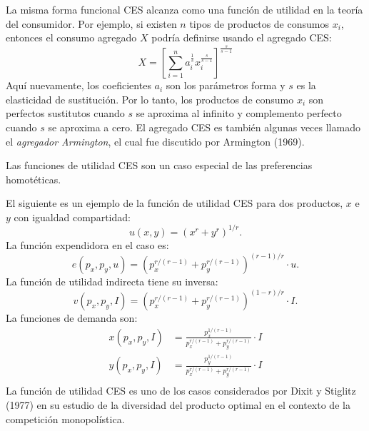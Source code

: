 \begin{definition}
La misma forma funcional CES alcanza como una función de utilidad en la teoría del consumidor. Por ejemplo, si existen $n$ tipos de productos de consumos $x_{i}$, entonces el consumo agregado $X$ podría definirse usando el agregado CES:
\begin{equation}
X={\left[\sum_{i=1}^{n}a^{\frac{1}{s}}_{i}x^{\frac{s}{s-1}}_{i}\right]}^{\frac{s}{s-1}}
\end{equation}
Aquí nuevamente, los coeficientes $a_{i}$ son los parámetros forma y $s$ es la elasticidad de sustitución. Por lo tanto, los productos de consumo $x_{i}$ son perfectos sustitutos cuando $s$ se aproxima al infinito y complemento perfecto cuando $s$ se aproxima a cero. El agregado CES es también algunas veces llamado el \emph{agregador Armington}, el cual fue discutido por Armington (1969).

Las funciones de utilidad CES son un caso especial de las preferencias homotéticas.

El siguiente es un ejemplo de la función de utilidad CES para dos productos, $x$ e $y$ con igualdad compartidad:
\begin{equation}
u\left(x,y\right)={\left(x^{r}+y^{r}\right)}^{1/r}.
\end{equation}
La función expendidora en el caso es:
\begin{equation}
e\left(p_{x},p_{y},u\right)={\left(p^{r/\left(r-1\right)}_{x}+p^{r/\left(r-1\right)}_{y}\right)}^{\left(r-1\right)/r}\cdot u.
\end{equation}
La función de utilidad indirecta tiene su inversa:
\begin{equation}
v\left(p_{x},p_{y},I\right)={\left(p^{r/\left(r-1\right)}_{x}+p^{r/\left(r-1\right)}_{y}\right)}^{\left(1-r\right)/r}\cdot I.
\end{equation}
La funciones de demanda son:
\begin{align*}
x\left(p_{x},p_{y},I\right)
&=\frac{p^{1/\left(r-1\right)}_{x}}{p^{r/\left(r-1\right)}_{x}+p^{r/\left(r-1\right)}_{y}}\cdot I\\
y\left(p_{x},p_{y},I\right)
&=\frac{p^{1/\left(r-1\right)}_{y}}{p^{r/\left(r-1\right)}_{x}+p^{r/\left(r-1\right)}_{y}}\cdot I\\
\end{align*}
La función de utilidad CES es uno de los casos considerados por Dixit y Stiglitz (1977) en su estudio de la diversidad del producto optimal en el contexto de la competición monopolística.


\end{definition}
